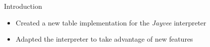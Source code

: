\begin{frame}[t]{Introduction}
	\begin{itemize}
		\item Created a new table implementation for the \emph{Jayvee} interpreter
		\item Adapted the interpreter to take advantage of new features
	\end{itemize}
\end{frame}
